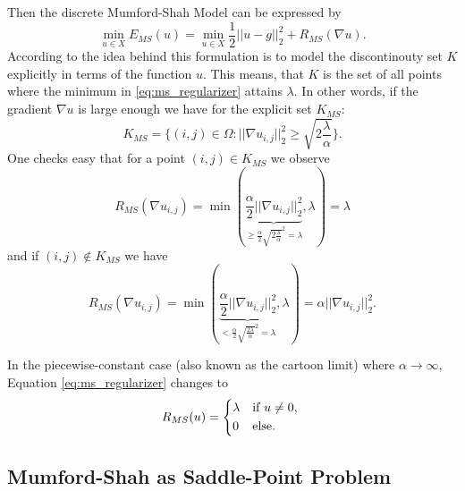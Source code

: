     Then the discrete Mumford-Shah Model can be expressed by
        \begin{equation}
            \min_{u \in X} E_{MS}(u) = \min_{u \in X} \frac{1}{2} ||u - g||_{2}^{2} + R_{MS}(\nabla u).
        \label{eq:discrete_mumford_shah_functional}
        \end{equation}
    According to \cite{Strekalovskiy-Cremers-eccv14} the idea behind this formulation is to model the discontinouty set $K$ explicitly in terms of the function $u$. This means, that $K$ is the set of all points where the minimum in \ref{eq:ms_regularizer} attains $\lambda$. In other words, if the gradient $\nabla u$ is large enough we have for the explicit set $K_{MS}$:
        \begin{equation}
            K_{MS} = \bigg\{ (i, j) \in \Omega : ||\nabla u_{i, j}||_{2}^{2} \ge \sqrt{2 \frac{\lambda}{\alpha}} \bigg\}.
        \label{eq:set_k_ms}
        \end{equation}
    One checks easy that for a point $(i, j) \in K_{MS}$ we observe
        $$
            R_{MS}(\nabla u_{i, j}) = \min(\underbrace{\frac{\alpha}{2}||\nabla u_{i, j}||_{2}^{2}}_{\ge \frac{\alpha}{2} \sqrt{2 \frac{\lambda}{\alpha}}^{2} = \lambda}, \lambda) = \lambda
        $$
    and if $(i, j) \notin K_{MS}$ we have
        $$
            R_{MS}(\nabla u_{i, j}) = \min(\underbrace{\frac{\alpha}{2}||\nabla u_{i, j}||_{2}^{2}}_{< \frac{\alpha}{2} \sqrt{\frac{2 \lambda}{\alpha}}^{2} = \lambda}, \lambda) = \alpha||\nabla u_{i, j}||_{2}^{2}.
        $$

    \begin{remark}
        In the piecewise-constant case (also known as the cartoon limit) where $\alpha \longrightarrow \infty$, Equation \ref{eq:ms_regularizer} changes to
            \begin{equation}
                R_{MS}(u) = 
                    \begin{dcases*}
                        \lambda & \textnormal{if $u \ne 0$,} \\
                        0 & \textnormal{else}.
                    \end{dcases*}
            \label{eq:ms_regularizer_piecewise_constant}
            \end{equation}
    \end{remark}

    \subsection{Mumford-Shah as Saddle-Point Problem} %
    \label{sub:mumford_shah_as_saddle_point_problem}

